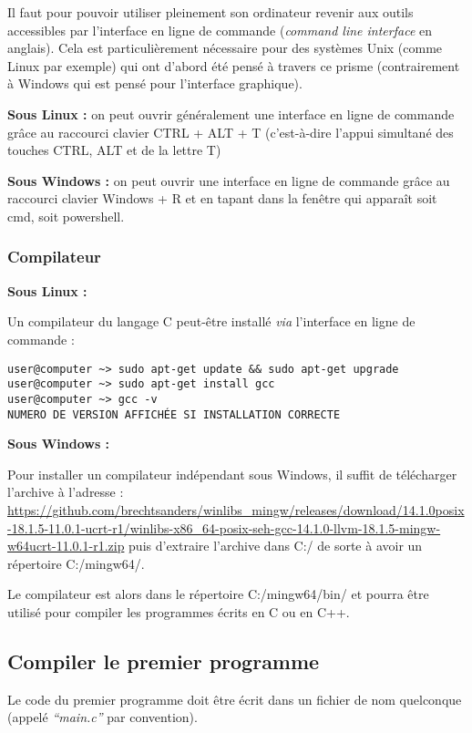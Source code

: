 \documentclass[../../main.tex]{subfiles}
\begin{document}
Il faut pour pouvoir utiliser pleinement son ordinateur revenir aux outils accessibles par l'interface en ligne de commande (\textit{command line interface} en anglais). Cela est particulièrement nécessaire pour des systèmes Unix (comme Linux par exemple) qui ont d'abord été pensé à travers ce prisme (contrairement à Windows qui est pensé pour l'interface graphique).

\textbf{Sous Linux :} on peut ouvrir généralement une interface en ligne de commande grâce au raccourci clavier \textsf{CTRL + ALT + T} (c'est-à-dire l'appui simultané des touches \textsf{CTRL}, \textsf{ALT} et de la lettre \textsf{T})

\textbf{Sous Windows :} on peut ouvrir une interface en ligne de commande grâce au raccourci clavier \textsf{Windows + R} et en tapant dans la fenêtre qui apparaît soit \textsf{cmd}, soit \textsf{powershell}.
\subsubsection{Compilateur} \label{ssub:compilateur}
\textbf{Sous Linux :}

Un compilateur du langage C peut-être installé \textit{via} l'interface en ligne de commande :
\begin{verbatim}
user@computer ~> sudo apt-get update && sudo apt-get upgrade
user@computer ~> sudo apt-get install gcc
user@computer ~> gcc -v
NUMERO DE VERSION AFFICHÉE SI INSTALLATION CORRECTE
\end{verbatim}

\textbf{Sous Windows :}

Pour installer un compilateur indépendant sous Windows, il suffit de télécharger l'archive à l'adresse : \url{https://github.com/brechtsanders/winlibs_mingw/releases/download/14.1.0posix-18.1.5-11.0.1-ucrt-r1/winlibs-x86_64-posix-seh-gcc-14.1.0-llvm-18.1.5-mingw-w64ucrt-11.0.1-r1.zip} puis d'extraire l'archive dans \textsf{C:/} de sorte à avoir un répertoire \textsf{C:/mingw64/}.

Le compilateur est alors dans le répertoire \textsf{C:/mingw64/bin/} et pourra être utilisé pour compiler les programmes écrits en C ou en C++.
\subsection{Compiler le premier programme} \label{sub:compiler_le_premier_programme}
Le code du premier programme doit être écrit dans un fichier de nom quelconque (appelé \textit{``main.c''} par convention).
\end{document}
